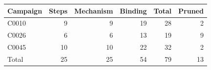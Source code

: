 \begin{tabular}{lrrrrr}
\toprule
\textbf{Campaign} & \textbf{Steps} & \textbf{Mechanism} & \textbf{Binding} & \textbf{Total} & \textbf{Pruned} \\
\midrule
C0010 & 9 & 9 & 19 & 28 & 2 \\
C0026 & 6 & 6 & 13 & 19 & 9 \\
C0045 & 10 & 10 & 22 & 32 & 2 \\
\midrule
Total & 25 & 25 & 54 & 79 & 13 \\
\bottomrule
\end{tabular}
